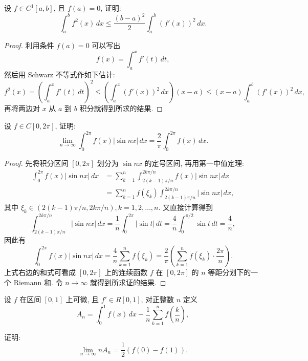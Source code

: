 \documentclass[lang=cn,12pt]{elegantbook}
\begin{document}
\vspace{1em}

\begin{example}
    设 $f \in C^1[a,b]$, 且 $f(a) = 0$, 证明:
    \[
    \int_{a}^{b} f^2(x) \, dx \le \frac{(b-a)^2}{2} \int_{a}^{b} (f'(x))^2 \, dx.
    \]
\end{example}

\begin{proof}
    利用条件 $f(a) = 0$ 可以写出
    \[
    f(x) = \int_{a}^{x} f'(t) \, dt,
    \]
    然后用 Schwarz 不等式作如下估计:
    \[
    f^2(x) = \left( \int_{a}^{x} f'(t) \, dt \right)^2
    \le \left( \int_{a}^{x} (f'(x))^2 \, dx \right) (x-a)
    \le (x-a) \int_{a}^{b} (f'(x))^2 \, dx,
    \]
    再将两边对 $x$ 从 $a$ 到 $b$ 积分就得到所求的结果.
\end{proof}

\vspace{1em}

\begin{example}
    设 $f \in C[0,2\pi]$, 证明:
    \[
    \lim_{n\to\infty} \int_{0}^{2\pi} f(x)|\sin nx| \, dx = \frac{2}{\pi} \int_{0}^{2\pi} f(x) \, dx. 
    \]
\end{example}

\begin{proof}
    先将积分区间 $[0,2\pi]$ 划分为 $\sin nx$ 的定号区间, 再用第一中值定理:
    \[
    \begin{aligned}
    \int_{0}^{2\pi} f(x)|\sin nx| \, dx
    &= \sum_{k=1}^{n} \int_{2(k-1)\pi/n}^{2k\pi/n} f(x)|\sin nx| \, dx \\
    &= \sum_{k=1}^{n} f(\xi_k) \int_{2(k-1)\pi/n}^{2k\pi/n} |\sin nx| \, dx,
    \end{aligned}
    \]
    其中 $\xi_k \in (2(k-1)\pi/n, 2k\pi/n), k=1,2,\dots,n$. 又直接计算得到
    \[
    \int_{2(k-1)\pi/n}^{2k\pi/n} |\sin nx| \, dx
    = \frac{1}{n} \int_{0}^{2\pi} |\sin t| \, dt
    = \frac{4}{n} \int_{0}^{\pi/2} \sin t \, dt
    = \frac{4}{n},
    \]
    因此有
    \[
    \int_{0}^{2\pi} f(x)|\sin nx| \, dx
    = \frac{4}{n} \sum_{k=1}^{n} f(\xi_k)
    = \frac{2}{\pi} \left( \sum_{k=1}^{n} f(\xi_k) \cdot \frac{2\pi}{n} \right).
    \]
    上式右边的和式可看成 $[0,2\pi]$ 上的连续函数 $f$ 在 $[0,2\pi]$ 的 $n$ 等距分划下的一个 Riemann 和. 令 $n \to \infty$ 就得到所求证的结果.
\end{proof}

\vspace{1em}

\begin{example}
    设 $f$ 在区间 $[0,1]$ 上可微, 且 $f' \in R[0,1]$, 对正整数 $n$ 定义
    \[
    A_n = \int_{0}^{1} f(x) \, dx - \frac{1}{n} \sum_{k=1}^{n} f\left( \frac{k}{n} \right),
    \]

    证明:
    \[
    \lim_{n \to \infty} n A_n = \frac{1}{2} \left( f(0) - f(1) \right).
    \]
\end{example}
\end{document}
